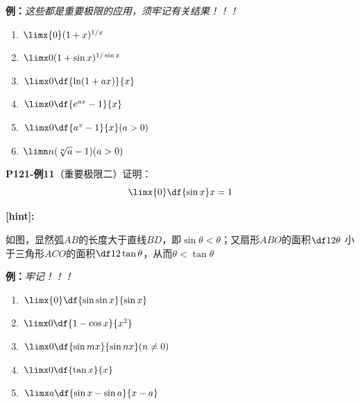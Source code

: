 {\bf 例：}{\it 这些都是重要极限的应用，须牢记有关结果！！！}
\begin{enumerate}[(1)]
  \setlength{\itemindent}{1cm}
  \item $\limx{0}(1+x)^{1/x}$ 
  \item $\limx 0(1+\sin x)^{1/\sin x}$ 
  \item $\limx 0\df{\ln(1+ax)}{x}$
  \item $\limx 0\df{e^{ax}-1}{x}$ 
  \item $\limx 0\df{a^x-1}{x}(a>0)$ 
  \item $\limn n(\sqrt[n]{a}-1) (a>0)$ 
\end{enumerate}

{\bf P121-例11}（重要极限二）证明：
$$\limx{0}\df {\sin x}x=1$$

{\bf [hint]:}
\begin{center}
\end{center}

如图，显然弧$AB$的长度大于直线$BD$，即$\sin\theta<\theta$；又扇形$ABO$的面积$\df12\theta$
小于三角形$ACO$的面积$\df12\tan\theta$，从而$\theta<\tan\theta$

{\bf 例：}{\it 牢记！！！}
\begin{enumerate}[(1)]
  \setlength{\itemindent}{1cm}
  \item $\limx{0}\df{\sin\sin x}{\sin x}$ 
  \item $\limx 0\df{1-\cos x}{x^2}$ 
  \item $\limx 0\df{\sin mx}{\sin nx}(n\ne 0)$
  \item $\limx 0\df{\tan x}{x}$
  \item $\limx a\df{\sin x-\sin a}{x-a}$
\end{enumerate}

